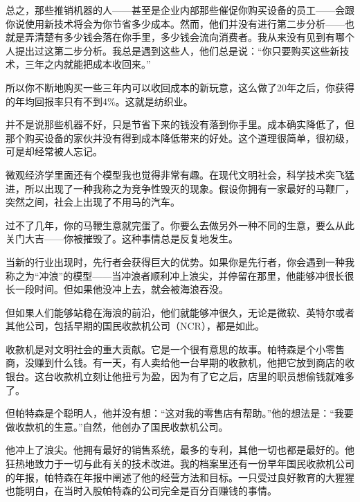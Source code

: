 总之，那些推销机器的人——甚至是企业内部那些催促你购买设备的员工——会跟你说使用新技术将会为你节省多少成本。然而，他们并没有进行第二步分析——也就是弄清楚有多少钱会落在你手里，多少钱会流向消费者。我从来没有见到有哪个人提出过这第二步分析。我总是遇到这些人，他们总是说：“你只要购买这些新技术，三年之内就能把成本收回来。”
\par

所以你不断地购买一些三年内可以收回成本的新玩意，这么做了20年之后，你获得的年均回报率只有不到4\%。这就是纺织业。
\par

并不是说那些机器不好，只是节省下来的钱没有落到你手里。成本确实降低了，但那个购买设备的家伙并没有得到成本降低带来的好处。这个道理很简单，很初级，可是却经常被人忘记。
\par

微观经济学里面还有个模型我也觉得非常有趣。在现代文明社会，科学技术突飞猛进，所以出现了一种我称之为竞争性毁灭的现象。假设你拥有一家最好的马鞭厂，突然之间，社会上出现了不用马的汽车。
\par

过不了几年，你的马鞭生意就完蛋了。你要么去做另外一种不同的生意，要么从此关门大吉——你被摧毁了。这种事情总是反复地发生。
\par

当新的行业出现时，先行者会获得巨大的优势。如果你是先行者，你会遇到一种我称之为“冲浪”的模型——当冲浪者顺利冲上浪尖，并停留在那里，他能够冲很长很长一段时间。但如果他没冲上去，就会被海浪吞没。
\par

但如果人们能够站稳在海浪的前沿，他们就能够冲很久，无论是微软、英特尔或者其他公司，包括早期的国民收款机公司（NCR），都是如此。
\par

收款机是对文明社会的重大贡献。它是一个很有意思的故事。帕特森是个小零售商，没赚到什么钱。有一天，有人卖给他一台早期的收款机，他把它放到商店的收银台。这台收款机立刻让他扭亏为盈，因为有了它之后，店里的职员想偷钱就难多了。
\par

但帕特森是个聪明人，他并没有想：“这对我的零售店有帮助。”他的想法是：“我要做收款机的生意。”自然，他创办了国民收款机公司。
\par

他冲上了浪尖。他拥有最好的销售系统，最多的专利，其他一切也都是最好的。他狂热地致力于一切与此有关的技术改进。我的档案里还有一份早年国民收款机公司的年报，帕特森在年报中阐述了他的经营方法和目标。一只受过良好教育的大猩猩也能明白，在当时入股帕特森的公司完全是百分百赚钱的事情。
\par

